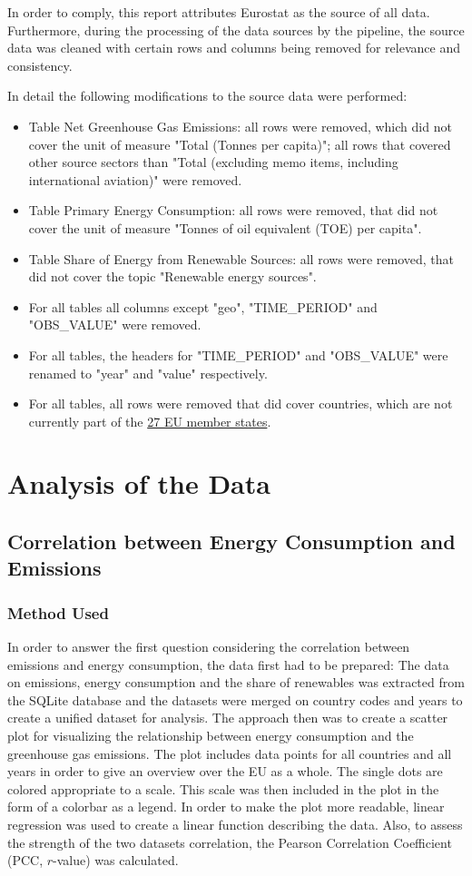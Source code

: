 \documentclass{article}
\begin{document}
In order to comply, this report attributes Eurostat as the source of all data.
Furthermore, during the processing of the data sources by the pipeline, the source data was cleaned with certain
rows and columns being removed for relevance and consistency.

In detail the following modifications to the source data were performed:
\begin{itemize}
    \item Table Net Greenhouse Gas Emissions: all rows were removed, which did not cover the unit of measure "Total (Tonnes per capita)";
    all rows that covered other source sectors than "Total (excluding memo items, including international aviation)" were removed.
    \item Table Primary Energy Consumption: all rows were removed, that did not cover the unit of measure "Tonnes of oil equivalent (TOE) per capita".
    \item Table Share of Energy from Renewable Sources: all rows were removed, that did not cover the topic "Renewable energy sources".
    \item For all tables all columns except "geo", "TIME\_PERIOD" and "OBS\_VALUE" were removed.
    \item For all tables, the headers for "TIME\_PERIOD" and "OBS\_VALUE" were renamed to "year" and "value" respectively.
    \item For all tables, all rows were removed that did cover countries, which are not currently part of the \href{https://www.destatis.de/Europa/EN/Country/Country-Codes.html}{27 EU member states}.
\end{itemize}

\section*{Analysis of the Data}
\subsection*{Correlation between Energy Consumption and Emissions}
\subsubsection*{Method Used}
In order to answer the first question considering the correlation between emissions and energy consumption, the data first had to be prepared:
The data on emissions, energy consumption and the share of renewables was extracted from the SQLite database and the datasets were merged on
country codes and years to create a unified dataset for analysis.
The approach then was to create a scatter plot for visualizing the relationship between energy consumption and the
greenhouse gas emissions. The plot includes data points for all countries and all years in order to give an overview
over the EU as a whole. The single dots are colored appropriate to a scale.
This scale was then included in the plot in the form of a colorbar as a legend.
In order to make the plot more readable, linear regression was used to create a linear function describing the data.
Also, to assess the strength of the two datasets correlation, the Pearson Correlation Coefficient (PCC, $r$-value) was calculated.
\end{document}
